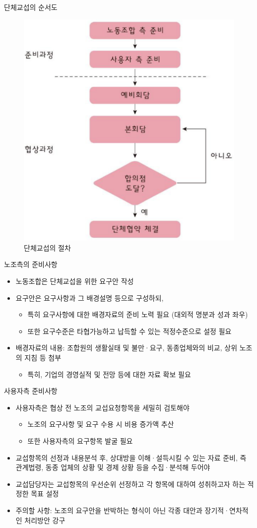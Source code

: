 \documentclass[aspectratio=169,xcolor=dvipsnames,handout]{beamer}
\begin{document}
\begin{frame}{단체교섭의 순서도}
\centering
\begin{figure}
    \includegraphics[width=.35\textwidth]{pic/단체교섭절차.png}
    \caption{단체교섭의 절차}
\end{figure}

\end{frame}
\begin{frame}{노조측의 준비사항}
    \begin{itemize}[<+->]
        \item 노동조합은 단체교섭을 위한 요구안 작성
        \item 요구안은 요구사항과 그 배경설명 등으로 구성하되,
        \begin{itemize}[<+->]
            \item 특히 요구사항에 대한 배경자료의 준비 노력 필요 (대외적 명분과 성과 좌우)
            \item 또한 요구수준은 타협가능하고 납득할 수 있는 적정수준으로 설정 필요
        \end{itemize}
    \item 배경자료의 내용: 조합원의 생활실태 및 불만·요구, 동종업체와의 비교, 상위 노조의 지침 등 첨부
        \begin{itemize}[<+->]
            \item 특히, 기업의 경영실적 및 전망 등에 대한 자료 확보 필요
        \end{itemize}
    \end{itemize}
\end{frame}

\begin{frame}{사용자측 준비사항}
    \begin{itemize}[<+->]
        \item 사용자측은 협상 전 노조의 교섭요청항목을 세밀히 검토해야
        \begin{itemize}[<+->]
            \item 노조의 요구사항 및 요구 수용 시 비용 증가액 추산
            \item 또한 사용자측의 요구항목 발굴 필요 
        \end{itemize}
    \item 교섭항목의 선정과 내용분석 후, 상대방을 이해·설득시킬 수 있는 자료 준비, 즉 관계법령, 동종 업체의 상황 및 경제 상황 등을 수집·분석해 두어야 
    \item 교섭담당자는 교섭항목의 우선순위 선정하고 각 항목에 대하여 성취하고자 하는 적정한 목표 설정
    \item 주의할 사항: 노조의 요구안을 반박하는 형식이 아닌 각종 대안과 장기적·연차적인 처리방안 강구
    \end{itemize}
\end{frame}
\end{document}
